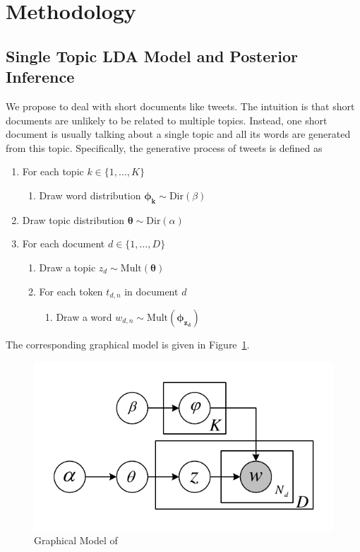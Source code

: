 \section{Methodology}
\label{sec:model}

\subsection{Single Topic LDA Model and Posterior Inference}

We propose \stlda to deal with short documents like tweets. The intuition is that short documents are unlikely to be related to multiple topics. Instead, one short document is usually talking about a single topic and all its words are generated from this topic. Specifically, the generative process of tweets is defined as

\begin{enumerate}
\item For each topic $k \in \{1, \ldots, K\}$
    \begin{enumerate}
    \item Draw word distribution $\bm{\phi_k} \sim \mathrm{Dir}(\beta)$
    \end{enumerate}
\item Draw topic distribution $\bm{\theta} \sim \mathrm{Dir}(\alpha)$
\item For each document $d \in \{1, \ldots, D\}$
    \begin{enumerate}
    \item Draw a topic $z_d \sim \mathrm{Mult}(\bm{\theta})$
    \item For each token $t_{d,n}$ in document $d$
        \begin{enumerate}
        \item Draw a word $w_{d,n} \sim \mathrm{Mult}(\bm{\phi_{z_d}})$
        \end{enumerate}
    \end{enumerate}
\end{enumerate}

The corresponding graphical model is given in Figure~\ref{fig:stlda}.

\begin{figure}[h]
\centering
\includegraphics[width=.8\linewidth]{figures/single.pdf}
\caption{Graphical Model of \stlda}\label{fig:stlda}
\end{figure}

